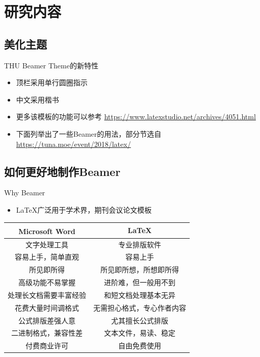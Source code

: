 \documentclass{beamer}
\begin{document}
	\section{研究内容}

	\subsection{美化主题}

	\begin{frame}{THU Beamer Theme的新特性}
		\begin{itemize}
			\item 顶栏采用单行圆圈指示
			\item 中文采用楷书
			\item 更多该模板的功能可以参考 \url{https://www.latexstudio.net/archives/4051.html}
			\item 下面列举出了一些Beamer的用法，部分节选自 \url{https://tuna.moe/event/2018/latex/}
		\end{itemize}
	\end{frame}

	\subsection{如何更好地制作Beamer}

	\begin{frame}{Why Beamer}
		\begin{itemize}
			\item \LaTeX 广泛用于学术界，期刊会议论文模板
		\end{itemize}
		\begin{table}[h]
			\centering
			\begin{tabular}{c|c}
				Microsoft\textsuperscript{\textregistered}  Word & \LaTeX \\
				\hline
				文字处理工具 & 专业排版软件 \\
				容易上手，简单直观 & 容易上手 \\
				所见即所得 & 所见即所想，所想即所得 \\
				高级功能不易掌握 & 进阶难，但一般用不到 \\
				处理长文档需要丰富经验 & 和短文档处理基本无异 \\
				花费大量时间调格式 & 无需担心格式，专心作者内容 \\
				公式排版差强人意 & 尤其擅长公式排版 \\
				二进制格式，兼容性差 & 文本文件，易读、稳定 \\
				付费商业许可 & 自由免费使用 \\
			\end{tabular}
		\end{table}
	\end{frame}
\end{document}
